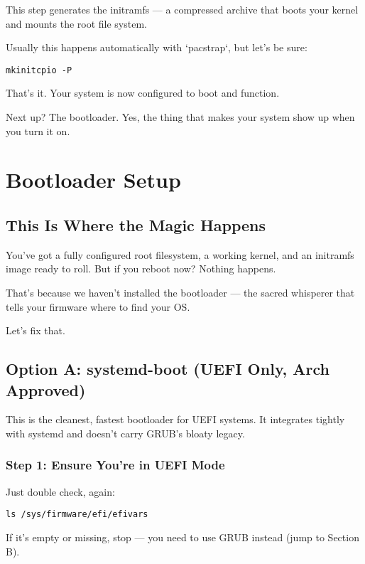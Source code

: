 \documentclass[12pt]{book}
\begin{document}
This step generates the initramfs — a compressed archive that boots your kernel and mounts the root file system.

Usually this happens automatically with `pacstrap`, but let’s be sure:

\begin{lstlisting}
mkinitcpio -P
\end{lstlisting}

That’s it. Your system is now configured to boot and function.

Next up? The bootloader. Yes, the thing that makes your system show up when you turn it on.

\clearpage



\chapter{Bootloader Setup}

\section*{This Is Where the Magic Happens}

You’ve got a fully configured root filesystem, a working kernel, and an initramfs image ready to roll. But if you reboot now? Nothing happens.

That’s because we haven’t installed the bootloader — the sacred whisperer that tells your firmware where to find your OS.

Let’s fix that.

\section{Option A: systemd-boot (UEFI Only, Arch Approved)}

This is the cleanest, fastest bootloader for UEFI systems. It integrates tightly with systemd and doesn't carry GRUB’s bloaty legacy.

\subsection*{Step 1: Ensure You’re in UEFI Mode}

Just double check, again:

\begin{lstlisting}
ls /sys/firmware/efi/efivars
\end{lstlisting}

If it’s empty or missing, stop — you need to use GRUB instead (jump to Section B).
\end{document}
